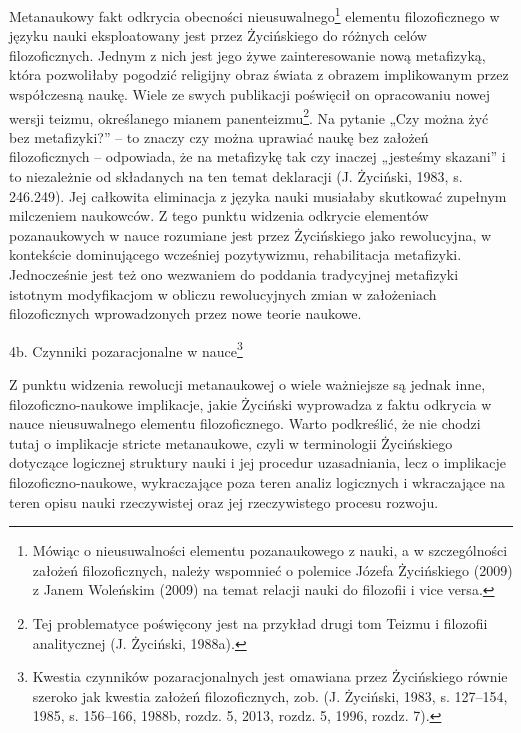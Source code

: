 \documentclass{article}
\begin{document}
Metanaukowy fakt odkrycia obecności nieusuwalnego\footnote{Mówiąc o nieusuwalności elementu pozanaukowego z nauki, a w
szczególności założeń filozoficznych, należy wspomnieć o polemice Józefa Życińskiego \label{ref:RND1yIXITCd0q}(2009) z
Janem Woleńskim \label{ref:RNDgHTjy4YLsK}(2009) na temat relacji nauki do filozofii i vice versa.} elementu
filozoficznego w języku nauki eksploatowany jest przez Życińskiego do różnych celów filozoficznych. Jednym z nich jest
jego żywe zainteresowanie nową metafizyką, która pozwoliłaby pogodzić religijny obraz świata z obrazem implikowanym
przez współczesną naukę. Wiele ze swych publikacji poświęcił on opracowaniu nowej wersji teizmu, określanego mianem
panenteizmu\footnote{Tej problematyce poświęcony jest na przykład drugi tom Teizmu i filozofii analitycznej
\label{ref:RNDIkjJ8iRdco}(J. Życiński, 1988a).}. Na pytanie „Czy można żyć bez metafizyki?” – to znaczy czy można
uprawiać naukę bez założeń filozoficznych – odpowiada, że na metafizykę tak czy inaczej „jesteśmy skazani” i to
niezależnie od składanych na ten temat deklaracji \label{ref:RNDBwmyHW0qHJ}(J. Życiński, 1983, s. 246.249). Jej
całkowita eliminacja z języka nauki musiałaby skutkować zupełnym milczeniem naukowców. Z tego punktu widzenia odkrycie
elementów pozanaukowych w nauce rozumiane jest przez Życińskiego jako rewolucyjna, w kontekście dominującego wcześniej
pozytywizmu, rehabilitacja metafizyki. Jednocześnie jest też ono wezwaniem do poddania tradycyjnej metafizyki istotnym
modyfikacjom w obliczu rewolucyjnych zmian w założeniach filozoficznych wprowadzonych przez nowe teorie naukowe. 

4b. Czynniki pozaracjonalne w nauce\footnote{Kwestia czynników pozaracjonalnych jest omawiana przez Życińskiego równie
szeroko jak kwestia założeń filozoficznych, zob. \label{ref:RND5w30wnfua2}(J. Życiński, 1983, s. 127–154, 1985, s.
156–166, 1988b, rozdz. 5, 2013, rozdz. 5, 1996, rozdz. 7).}

Z punktu widzenia rewolucji metanaukowej o wiele ważniejsze są jednak inne, filozoficzno-naukowe implikacje, jakie
Życiński wyprowadza z faktu odkrycia w nauce nieusuwalnego elementu filozoficznego. Warto podkreślić, że nie chodzi
tutaj o implikacje stricte metanaukowe, czyli w terminologii Życińskiego dotyczące logicznej struktury nauki i jej
procedur uzasadniania, lecz o implikacje filozoficzno-naukowe, wykraczające poza teren analiz logicznych i wkraczające
na teren opisu nauki rzeczywistej oraz jej rzeczywistego procesu rozwoju. 
\end{document}
